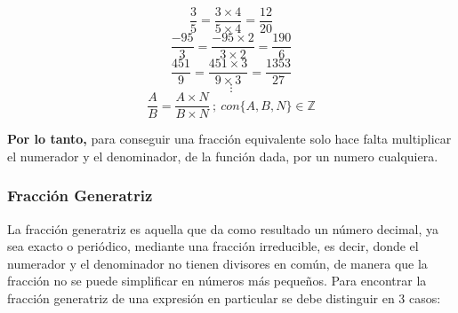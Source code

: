 \documentclass[12pt]{article}
\begin{document}
        $$\frac{3}{5} =\frac{3\times4}{5\times4} = \frac{12}{20} $$
        $$\frac{-95}{3} = \frac{-95\times2}{3\times2} =\frac{190}{6} $$
        $$\frac{451}{9} = \frac{451\times3}{9\times3} =	\frac{1353}{27} $$
        $$\vdots$$
        $$\frac{A}{B} = \frac{A\times N}{B\times N}\ ;\ con \{A,B,N \} \in \mathbb{Z}$$

    \textbf{Por lo tanto,} para conseguir una fracción equivalente solo hace falta
    multiplicar el numerador y el denominador, de la función dada, por un numero cualquiera.



\subsubsection*{Fracción Generatriz}
    La fracción generatriz es aquella que da como resultado un número decimal,
    ya sea exacto o periódico, mediante una fracción irreducible, es decir,
    donde el numerador y el denominador no tienen divisores en común, de manera
    que la fracción no se puede simplificar en números más pequeños. Para
    encontrar la fracción generatriz de una expresión en particular se debe
    distinguir en 3 casos:
\end{document}
